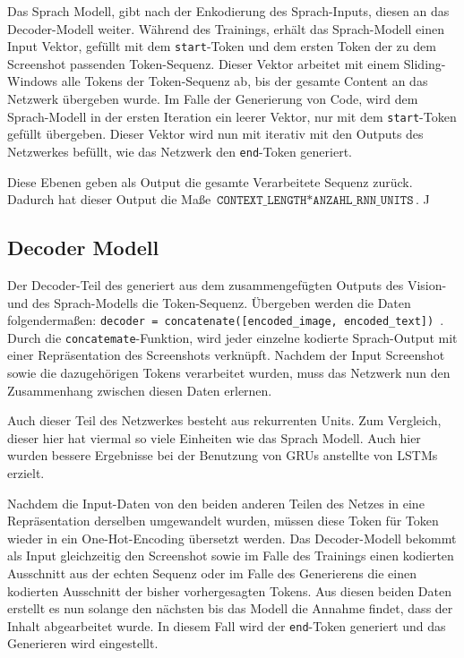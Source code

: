 \documentclass[pdftex,a4paper,halfparskip, article]{scrartcl}
\begin{document}
Das Sprach Modell, gibt nach der Enkodierung des Sprach-Inputs, diesen an das Decoder-Modell weiter. Während des Trainings, erhält das Sprach-Modell einen Input Vektor, gefüllt mit dem \texttt{start}-Token und dem ersten Token der zu dem Screenshot passenden Token-Sequenz. Dieser Vektor arbeitet mit einem Sliding-Windows alle Tokens der Token-Sequenz ab, bis der gesamte Content an das Netzwerk übergeben wurde. Im Falle der Generierung von Code, wird dem Sprach-Modell in der ersten Iteration ein leerer Vektor, nur mit dem \texttt{start}-Token gefüllt übergeben. Dieser Vektor wird nun mit iterativ mit den Outputs des Netzwerkes befüllt, wie das Netzwerk den \texttt{end}-Token generiert.

Diese Ebenen geben als Output die gesamte Verarbeitete Sequenz zurück. Dadurch hat dieser Output die Maße $\texttt{CONTEXT\_LENGTH} * \texttt{ANZAHL\_RNN\_UNITS}$. J


\subsection{Decoder Modell}



Der Decoder-Teil des generiert aus dem zusammengefügten Outputs des Vision- und des Sprach-Modells die Token-Sequenz. Übergeben werden die Daten folgendermaßen: \texttt{decoder = concatenate([encoded\_image, encoded\_text])
}. Durch die \texttt{concatemate}-Funktion, wird jeder einzelne kodierte Sprach-Output mit einer Repräsentation des Screenshots verknüpft.  Nachdem der Input Screenshot sowie die dazugehörigen Tokens verarbeitet wurden, muss das Netzwerk nun den Zusammenhang zwischen diesen Daten erlernen. 

Auch dieser Teil des Netzwerkes besteht aus rekurrenten Units. Zum Vergleich, dieser hier hat viermal so viele Einheiten wie das Sprach Modell. Auch hier wurden bessere Ergebnisse bei der Benutzung von GRUs anstellte von LSTMs erzielt.

Nachdem die Input-Daten von den beiden anderen Teilen des Netzes in eine Repräsentation derselben umgewandelt wurden, müssen diese Token für Token wieder in ein One-Hot-Encoding übersetzt werden. Das Decoder-Modell bekommt als Input gleichzeitig den Screenshot sowie im Falle des Trainings einen kodierten Ausschnitt aus der echten Sequenz oder im Falle des Generierens die einen kodierten Ausschnitt der bisher vorhergesagten Tokens. Aus diesen beiden Daten erstellt es nun solange den nächsten bis das Modell die Annahme findet, dass der Inhalt abgearbeitet wurde. In diesem Fall wird der \texttt{end}-Token generiert und das Generieren wird eingestellt.
\end{document}
